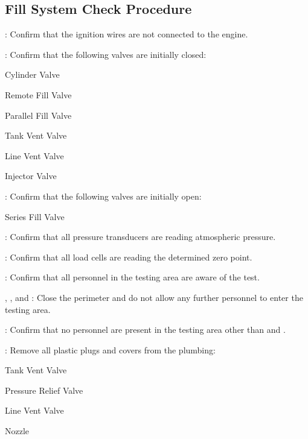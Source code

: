 \newpage

\subsection{Fill System Check Procedure}
\begin{checklist}
    \item \secondary{}: Confirm that the ignition wires are not connected to the engine.
    \item \primary{}: Confirm that the following valves are initially closed:
    \begin{checklist}
        \item Cylinder Valve
        \item Remote Fill Valve
        \item Parallel Fill Valve
        \item Tank Vent Valve
        \item Line Vent Valve
        \item Injector Valve
    \end{checklist}
    \item \primary{}: Confirm that the following valves are initially open:
    \begin{checklist}
        \item Series Fill Valve
    \end{checklist}
    \item \daq{}: Confirm that all pressure transducers are reading atmospheric pressure.
    \item \daq{}: Confirm that all load cells are reading the determined zero point.
    \item \ops{}: Confirm that all personnel in the testing area are aware of the test.
    \item \peri{}, \perii{}, and \periii{}: Close the perimeter and do not allow any further personnel to enter the testing area.
    \item \secondary{}: Confirm that no personnel are present in the testing area other than \primary{} and \secondary{}.
    \item \primary{}: Remove all plastic plugs and covers from the plumbing:
    \begin {checklist}
        \item Tank Vent Valve
        \item Pressure Relief Valve
        \item Line Vent Valve
        \item Nozzle

\end{checklist}
\end{checklist}
